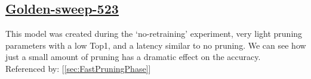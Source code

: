 \documentclass[11pt]{report}
\begin{document}
\newpage

\subsection*{\protect\href{https://wandb.ai/samfh/Resnet56-Filters-Test/runs/eje5tk6m/overview?workspace=}{\underline{\color{blue}Golden-sweep-523}}}\label{sec:golden-sweep-523}
This model was created during the `no-retraining' experiment, very light pruning parameters with a low Top1, and a latency similar to no pruning. We can see how just a small amount of pruning has a dramatic effect on the accuracy.\\
Referenced by: [\ref{sec:FastPruningPhase}]
\singlespacing
\begin{figure}[H]
    \begin{table}[H]
        \centering
        \hspace{2em}
        \quad
    \end{table}    
\end{figure}
\doublespacing
\end{document}
